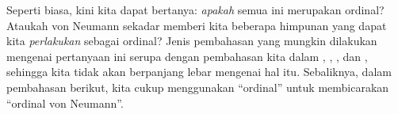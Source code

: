 \documentclass[../../../include/open-logic-section]{subfiles}
\begin{document}
Seperti biasa, kini kita dapat bertanya: \emph{apakah} semua ini merupakan
ordinal? Ataukah von Neumann sekadar memberi kita beberapa himpunan yang
dapat kita \emph{perlakukan} sebagai ordinal? Jenis pembahasan yang mungkin
dilakukan mengenai pertanyaan ini serupa dengan pembahasan kita dalam
,
,
, dan
, sehingga kita tidak akan berpanjang lebar mengenai
hal itu. Sebaliknya, dalam pembahasan berikut, kita cukup menggunakan
``ordinal'' untuk membicarakan ``ordinal von Neumann''.
\end{document}
